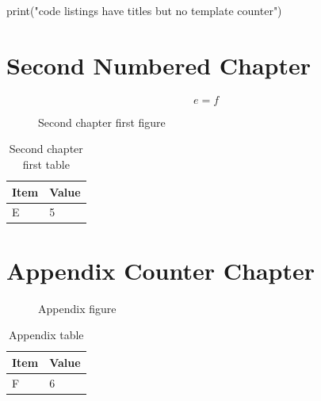 \documentclass{ndsudisq}
\begin{document}
\begin{schema}[htbp]
  \centering
  \fbox{\rule{0pt}{0.5in}\rule{1.2in}{0pt}}
  \caption{First chapter schema}
\end{schema}

\begin{ndsucodelisting}
print("code listings have titles but no template counter")
\end{ndsucodelisting}

\chapter{Second Numbered Chapter}

\begin{equation}
  e = f
\end{equation}

\begin{figure}[htbp]
  \centering
  \fbox{\rule{0pt}{0.5in}\rule{1.2in}{0pt}}
  \caption{Second chapter first figure}
\end{figure}

\begin{table}[htbp]
  \centering
  \caption{Second chapter first table}
  \begin{tabular}{ll}
    \toprule
    Item & Value \\
    \midrule
    E & 5 \\
    \bottomrule
  \end{tabular}
\end{table}

\begin{schema}[htbp]
  \centering
  \fbox{\rule{0pt}{0.5in}\rule{1.2in}{0pt}}
  \caption{Second chapter schema}
\end{schema}

\appendicesmatter
\chapter{Appendix Counter Chapter}

\begin{figure}[htbp]
  \centering
  \fbox{\rule{0pt}{0.5in}\rule{1.2in}{0pt}}
  \caption{Appendix figure}
\end{figure}

\begin{table}[htbp]
  \centering
  \caption{Appendix table}
  \begin{tabular}{ll}
    \toprule
    Item & Value \\
    \midrule
    F & 6 \\
    \bottomrule
  \end{tabular}
\end{table}
\end{document}
